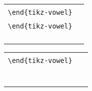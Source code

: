 \documentclass{article}
\begin{document}
\begin{center}
\begin{tabular}{ll}
  \begin{minipage}[t]{6.5cm}{\small
    \verb|\begin{tikz-vowel}[simple,labels]|\\
    \verb|\end{tikz-vowel}|\\}
  \end{minipage} &
  \begin{minipage}[t]{6.5cm}{\small
    \verb|\begin{tikz-vowel}[standard,labels]|\\
    \verb|\end{tikz-vowel}|\\}
  \end{minipage} \\
  \begin{minipage}[t]{6.5cm}{
  \hspace*{-1.75cm}
  \begin{tikz-vowel}\end{tikz-vowel} \\}\end{minipage} &
  \begin{minipage}[t]{6.5cm}{
  \hspace*{-1.5cm}
  \begin{tikz-vowel}\end{tikz-vowel} \\}\end{minipage}
\end{tabular}

\bigskip

\begin{tabular}{ll}
  \begin{minipage}[t]{6.5cm}{\small
    \verb|\begin{tikz-vowel}[three,labels]|\\
    \verb|\end{tikz-vowel}|\\}
  \end{minipage} & 
  \begin{minipage}[t]{6.5cm}
  {~}
  \end{minipage} \\
  \begin{minipage}[t]{6.5cm}{
  \hspace*{-1.75cm}
  \begin{tikz-vowel}\end{tikz-vowel} \\}\end{minipage} &
\end{tabular}
\end{center}
\end{document}

